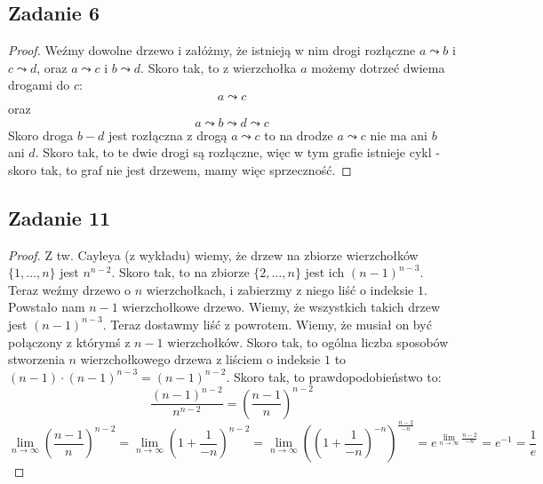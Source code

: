 \documentclass[a4paper]{article}
\begin{document}
\subsection*{Zadanie 6}

\begin{proof}

Weźmy dowolne drzewo i załóżmy, że istnieją w nim drogi rozłączne $a \leadsto b$ i $c \leadsto d$, oraz $a \leadsto c$ i $b \leadsto d$. Skoro tak, to z wierzchołka $a$ możemy dotrzeć dwiema drogami do $c$: $$a\leadsto c$$ oraz $$a\leadsto b\leadsto d\leadsto c$$ Skoro droga $b-d$ jest rozłączna z drogą $a \leadsto c$ to na drodze $a \leadsto c$ nie ma ani $b$ ani $d$. Skoro tak, to te dwie drogi są rozłączne, więc w tym grafie istnieje cykl - skoro tak, to graf nie jest drzewem, mamy więc sprzeczność. 

\end{proof}

\subsection*{Zadanie 11}

\begin{proof}

Z tw. Cayleya (z wykładu) wiemy, że drzew na zbiorze wierzchołków $\lbrace 1,\dots,n\rbrace$ jest $n^{n-2}$. Skoro tak, to na zbiorze $\lbrace 2,\dots,n\rbrace$ jest ich $(n-1)^{n-3}$. Teraz weźmy drzewo o $n$ wierzchołkach, i zabierzmy z niego liść o indeksie $1$. Powstało nam $n-1$ wierzchołkowe drzewo. Wiemy, że wszystkich takich drzew jest $(n-1)^{n-3}$. Teraz dostawmy liść z powrotem. Wiemy, że musiał on być połączony z którymś z $n-1$ wierzchołków. Skoro tak, to ogólna liczba sposobów stworzenia $n$ wierzchołkowego drzewa z liściem o indeksie $1$ to $(n-1)\cdot (n-1)^{n-3} = (n-1)^{n-2}$. Skoro tak, to prawdopodobieństwo to:$$\frac{(n-1)^{n-2}}{n^{n-2}} = \left(\frac{n-1}{n}\right)^{n-2}$$ 
$$\lim\limits_{n\rightarrow \infty} \left(\frac{n-1}{n}\right)^{n-2} = \lim\limits_{n\rightarrow \infty} \left(1 + \frac{1}{-n}\right)^{n-2} = \lim\limits_{n\rightarrow \infty} \left(\left(1 + \frac{1}{-n}\right)^{-n}\right)^{\frac{n-2}{-n}} =  e^{\lim\limits_{n\rightarrow \infty} \frac{n-2}{-n}} = e^{-1} =\frac{1}{e}$$

\end{proof}
\end{document}
